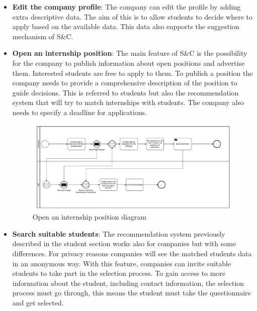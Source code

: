 \begin{itemize}
      \item \textbf{Edit the company profile}: The company can edit the profile by adding extra descriptive data. The
            aim of this is to allow students to decide where to apply based on the available data. This data also
            supports the suggestion mechanism of S\&C.
      \item \textbf{Open an internship position}: The main feature of S\&C is the possibility for the company to
            publish information about open positions and advertise them. Interested students are free to apply to them.
            To publish a position the company needs to provide a comprehensive description of the position to guide
            decisions. This is referred to students but also the recommendation system that will try to match
            internships with students. The company also needs to specify a deadline for applications.

            \begin{figure}[H]
                  \centering
                  \includegraphics[width=1.0\textwidth]{Images/BPMN_9.pdf}
                  \caption{Open an internship position diagram}
                  \label{fig:open_an_internship_position_diagram}
            \end{figure}

      \item \textbf{Search suitable students}: The recommendation system previously described in the student section
            works also for companies but with some differences. For privacy reasons companies will see the matched
            students data in an anonymous way. With this feature, companies can invite suitable students to take part
            in the selection process. To gain access to more information about the student, including contact
            information, the selection process must go through, this means the student must take the questionnaire and
            get selected.


\end{itemize}
